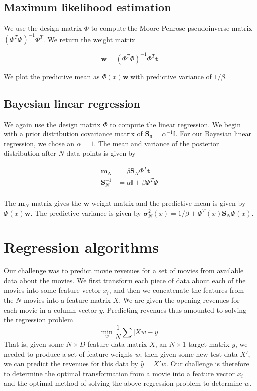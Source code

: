 \documentclass[11pt]{amsart}
\begin{document}
\subsection{Maximum likelihood estimation}

We use the design matrix $\Phi$ to compute the Moore-Penrose pseudoinverse matrix $(\Phi ^ T \Phi)^{-1} \Phi ^T$. We return the weight matrix 

$$\mathbf{w} = (\Phi ^ T \Phi)^{-1} \Phi ^T \mathbf{t}$$

We plot the predictive mean as $\Phi(x) \mathbf{w}$ with predictive variance of $1 / \beta$.

\subsection{Bayesian linear regression}

We again use the design matrix $\Phi$ to compute the linear regression. We begin with a prior distribution covariance matrix of $\mathbf{S_0} = \alpha ^{-1} \mathbb{I}$. For our Bayesian linear regression, we chose an $\alpha = 1$. The mean and variance of the posterior distribution after $N$ data points is given by

\begin{align*}
\mathbf{m}_N &= \beta \mathbf{S}_N \Phi ^ T \mathbf{t} \\
\mathbf{S}_N^{-1} &= \alpha \mathbb{I} + \beta \Phi ^ T \Phi \\
\end{align*}

The $\mathbf{m}_N$ matrix gives the $\mathbf{w}$ weight matrix and the predictive mean is given by $\Phi(x) \mathbf{w}$. The predictive variance is given by $\mathbf{\sigma}^2_N(x) = 1 / \beta + \Phi^T(x) \mathbf{S}_N \Phi(x)$. \\

\section{Regression algorithms}

Our challenge was to predict movie revenues for a set of movies from available data about the movies. We first transform each piece of data about each of the movies into some feature vector $x_i$, and then we concatenate the features from the $N$ movies into a feature matrix $X$. We are given the opening revenues for each movie in a column vector $y$. Predicting revenues thus amounted to solving the regression problem
$$\min_w \frac{1}{N}\sum |X w - y|$$
That is, given some $N \times D$ feature data matrix $X$, an $N \times 1$ target matrix $y$, we needed to produce a set of feature weights $w$; then given some new test data $X'$, we can predict the revenues for this data by $\hat{y} = X' w$. Our challenge is therefore to determine the optimal transformation from a movie into a feature vector $x_i$ and the optimal method of solving the above regression problem to determine $w$. 
\end{document}
